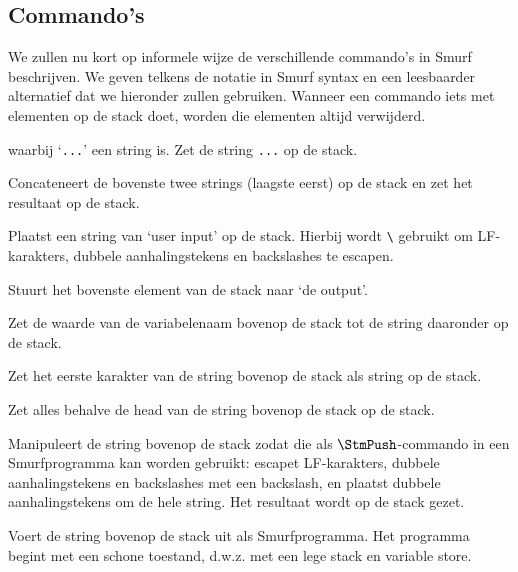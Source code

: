 \subsection{Commando's}
\label{sec:intro:commands}
We zullen nu kort op informele wijze de verschillende commando's in Smurf
beschrijven. We geven telkens de notatie in Smurf syntax en een leesbaarder
alternatief dat we hieronder zullen gebruiken. Wanneer een commando iets met
elementen op de stack doet, worden die elementen altijd verwijderd.

\begin{description}[style=nextline,font=\normalfont]
	\item[\smurfinline{"..."} of $\StmPush~\texttt{...}$]
		waarbij `\texttt{...}' een string is. Zet de string \texttt{...} op de
		stack.
	\item[\smurfinline{+} of $\StmCat$]
		Concateneert de bovenste twee strings (laagste eerst) op de stack en zet
		het resultaat op de stack.
	\item[\smurfinline{i} of $\StmInput$]
		Plaatst een string van `user input' op de stack. Hierbij wordt
		\texttt{\textbackslash} gebruikt om LF-karakters, dubbele aanhalingstekens
		en backslashes te escapen.
	\item[\smurfinline{o} of $\StmOutput$]
		Stuurt het bovenste element van de stack naar `de output'.
	\item[\smurfinline{p} of $\StmPut$]
		Zet de waarde van de variabelenaam bovenop de stack tot de string daaronder
		op de stack.
	\item[\smurfinline{h} of $\StmHead$]
		Zet het eerste karakter van de string bovenop de stack als string op de
		stack.
	\item[\smurfinline{t} of $\StmTail$]
		Zet alles behalve de head van de string bovenop de stack op de stack.
	\item[\smurfinline{q} of $\StmQuotify$]
		Manipuleert de string bovenop de stack zodat die als $\StmPush$-commando in
		een Smurfprogramma kan worden gebruikt: escapet LF-karakters, dubbele
		aanhalingstekens en backslashes met een backslash, en plaatst dubbele
		aanhalingstekens om de hele string. Het resultaat wordt op de stack gezet.
	\item[\smurfinline{x} of $\StmExec$]
		Voert de string bovenop de stack uit als Smurfprogramma. Het programma
		begint met een schone toestand, d.w.z. met een lege stack en variable
		store.
\end{description}

